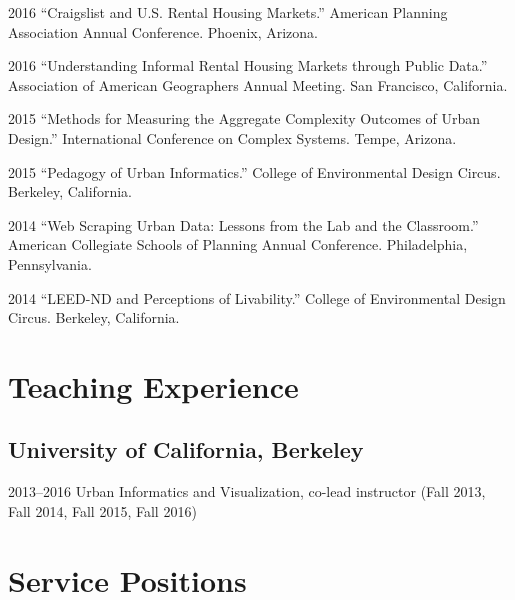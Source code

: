 \documentclass{mycv}
\begin{document}
\begin{tablist}

\item[2016] \tab \enquote{Craigslist and U.S. Rental Housing Markets.} American Planning Association Annual Conference. Phoenix, Arizona.

\item[2016] \tab \enquote{Understanding Informal Rental Housing Markets through Public Data.} Association of American Geographers Annual Meeting. San Francisco, California.

\item[2015] \tab \enquote{Methods for Measuring the Aggregate Complexity Outcomes of Urban Design.} International Conference on Complex Systems. Tempe, Arizona.

\item[2015] \tab \enquote{Pedagogy of Urban Informatics.} College of Environmental Design Circus. Berkeley, California.

\item[2014] \tab \enquote{Web Scraping Urban Data: Lessons from the Lab and the Classroom.} American Collegiate Schools of Planning Annual Conference. Philadelphia, Pennsylvania.

\item[2014] \tab \enquote{LEED-ND and Perceptions of Livability.} College of Environmental Design Circus. Berkeley, California.

\end{tablist}



\section*{Teaching Experience}

\subsection*{University of California, Berkeley}

\begin{tablist}
\item[2013--2016] \tab Urban Informatics and Visualization, co-lead instructor (Fall 2013, Fall 2014, Fall 2015, Fall 2016)
\end{tablist}



\section*{Service Positions}
\end{document}

